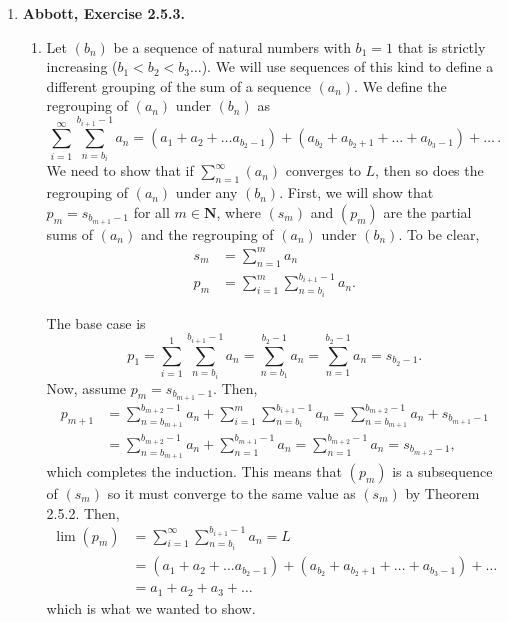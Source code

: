\documentclass{article}
\newcommand{\N}{\mathbf{N}}
\newcommand{\exc}[2][Abbott]{\item \textbf{#1, Exercise #2.}}
\begin{document}
\begin{enumerate}
    \exc{2.5.3}
    \begin{enumerate}
        \item Let $(b_n)$ be a sequence of natural numbers with $b_1 = 1$ that is strictly increasing ($b_1<b_2<b_3 \dots$). We will use sequences of this kind to define a different grouping of the sum of a sequence $(a_n)$. We define the regrouping of $(a_n)$ under $(b_n)$ as 
        \begin{equation*}
            \sum_{i=1}^\infty \sum_{n=b_i}^{b_{i+1}-1} a_n = (a_1 + a_2 + \dots a_{b_{2}-1}) + (a_{b_2} + a_{b_2 + 1} + \dots + a_{b_3-1}) + \dots \, .
        \end{equation*} We need to show that if $\sum_{n=1}^\infty (a_n)$ converges to $L$, then so does the regrouping of $(a_n)$ under any $(b_n)$. First, we will show that $p_m = s_{b_{m+1}-1}$ for all $m \in \N$, where $(s_m)$ and $(p_m)$ are the partial sums of $(a_n)$ and the regrouping of $(a_n)$ under $(b_n)$. To be clear,
        \begin{align*}
            s_m &= \sum_{n=1}^m a_n \\
            p_m &= \sum_{i=1}^m \sum_{n=b_i}^{b_{i+1}-1} a_n.
        \end{align*}
        
        The base case is 
        \begin{equation*}
            p_1 = \sum_{i=1}^1 \sum_{n=b_i}^{b_{i+1}-1} a_n = \sum_{n=b_1}^{b_{2}-1} a_n = \sum_{n=1}^{b_{2}-1} a_n = s_{b_{2}-1}.
        \end{equation*} Now, assume $p_m = s_{b_{m+1}-1}$. Then, 
        \begin{align*}
            p_{m+1} &= \sum_{n=b_{m+1}}^{b_{m+2}-1} a_n + \sum_{i=1}^m \sum_{n=b_i}^{b_{i+1}-1} a_n = \sum_{n=b_{m+1}}^{b_{m+2}-1} a_n + s_{b_{m+1}-1} \\ & = \sum_{n=b_{m+1}}^{b_{m+2}-1} a_n + \sum_{n=1}^{b_{m+1}-1} a_n = \sum_{n=1}^{b_{m+2}-1} a_n = s_{b_{m+2}-1}, 
        \end{align*} which completes the induction. This means that $(p_m)$ is a subsequence of $(s_m)$ so it must converge to the same value as $(s_m)$ by Theorem 2.5.2. Then,
        \begin{align*}
             \lim (p_m) &= \sum_{i=1}^\infty \sum_{n=b_i}^{b_{i+1}-1} a_n = L \\
             &= (a_1 + a_2 + \dots a_{b_{2}-1}) + (a_{b_2} + a_{b_2 + 1} + \dots + a_{b_3-1}) + \dots \\ &= a_1+a_2+a_3+\dots
        \end{align*} which is what we wanted to show.
        

\end{enumerate}
\end{enumerate}
\end{document}
